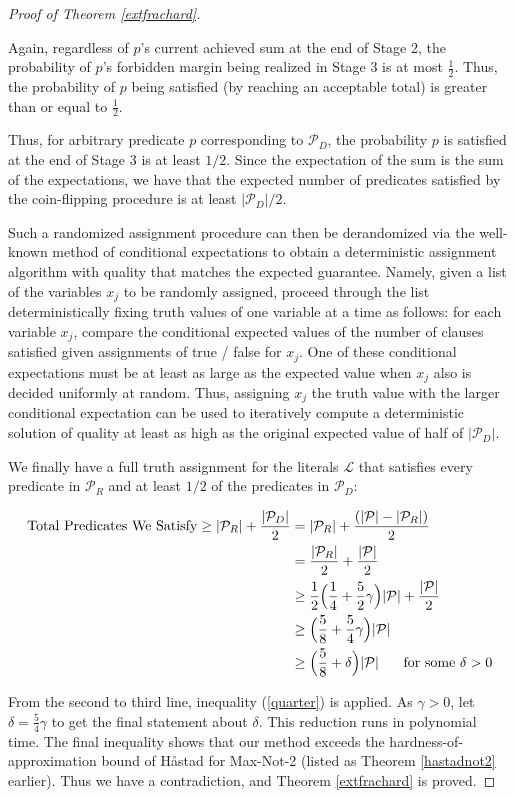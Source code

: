 \documentclass{article}
\begin{document}
\begin{proof}[Proof of Theorem \ref{extfrachard}]
\begin{enumerate}
Again, regardless of $p$'s current achieved sum at the end of Stage 2, the probability of $p$'s forbidden margin being realized in Stage 3 is at most $\frac{1}{2}$. Thus, the probability of $p$ being satisfied (by reaching an acceptable total) is greater than or equal to $\frac{1}{2}$.
\end{enumerate}

\vspace{-2mm}
\noindent Thus, for arbitrary predicate $p$ corresponding to $\mathcal{P}_D$, the probability $p$ is satisfied at the end of Stage 3 is at least $ 1/2$. Since the expectation of the sum is the sum of the expectations, we have that the expected number of predicates satisfied by the coin-flipping procedure is at least $|\mathcal{P}_D|/2$.  

Such a randomized assignment procedure can then be derandomized via the well-known method of conditional expectations to obtain a deterministic assignment algorithm with quality that matches the expected guarantee.
Namely, given a list of the variables $x_j$ to be randomly assigned, proceed through the list deterministically fixing truth values of one variable at a time as follows: for each variable $x_j$, compare the conditional expected values of the number of clauses satisfied given assignments of true / false for $x_j$. One of these conditional expectations must be at least as large as the expected value when $x_j$ also is decided uniformly at random.  Thus, assigning $x_j$ the truth value with the larger conditional expectation can be used to iteratively compute a deterministic solution of quality at least as high as the original expected value of half of $|\mathcal{P}_D|$.

We finally have a full truth assignment for the literals $\mathcal{L}$ that satisfies every predicate in $\mathcal{P}_R$ and at least $1/2$ of the predicates in $\mathcal{P}_D$:

\begin{align*}
\text{Total Predicates We Satisfy}\geq|\mathcal{P}_R|+\frac{|\mathcal{P}_D|}{2} 
&= 
|\mathcal{P}_R|+\frac{(|\mathcal{P}|-|\mathcal{P}_R|)}{2}\\
&= 
\frac{|\mathcal{P}_R|}{2}+\frac{|\mathcal{P}|}{2}\\
&\geq 
\frac{1}{2}\Big(\frac{1}{4}+\frac{5}{2}\gamma\Big)|\mathcal{P}|+\frac{|\mathcal{P}|}{2}\\
&\geq 
\Big(\frac{5}{8}+\frac{5}{4}\gamma\Big)|\mathcal{P}|\\
&\geq 
\Big(\frac{5}{8}+\delta\Big)|\mathcal{P}| \hspace{5mm} \text{ for some  $\delta>0$}
\end{align*}

From the second to third line, inequality (\ref{quarter}) is applied. As $\gamma>0$, let $\delta=\frac{5}{4}\gamma$ to get the final statement about $\delta$. This reduction runs in polynomial time. The
final inequality shows that our method exceeds the hardness-of-approximation bound of H{\aa}stad for Max-Not-2 (listed as Theorem \ref{hastadnot2} earlier). Thus we have a contradiction, and Theorem \ref{extfrachard} is proved.
\end{proof}
\end{document}
